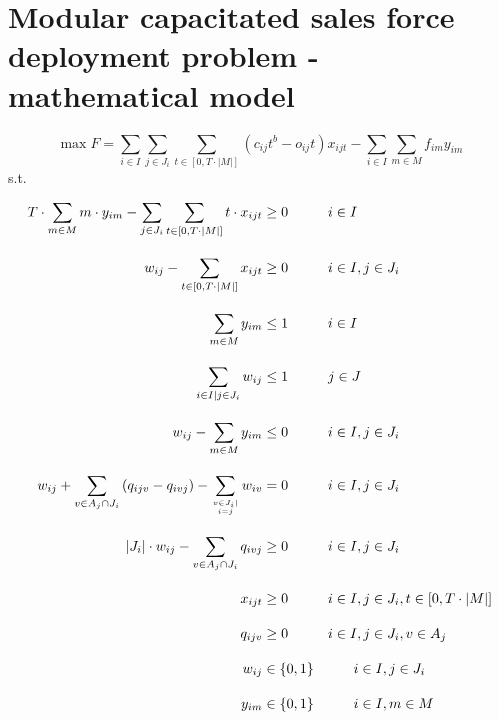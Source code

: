 \documentclass{article}
\begin{document}
\section{Modular capacitated sales force deployment problem - mathematical model}
 \vspace{4em}
\begin{equation}
     \max F = \sum_{i \in I} \sum_{j \in J_i} \sum_{t \in [0,T \cdot |M|]} (c_{ij}t^b - o_{ij}t)  x_{ijt} - \sum_{i \in I} \sum_{m \in M} f_{im} y_{im}
\end{equation}
s.t.

\begin{align}
     T \cdot \sum_{m \in M}m \cdot y_{im} - \sum_{ j \in J_i} \sum_{t\in [0,T \cdot |M|]} t \cdot x_{ijt}  &\ge 0   \hspace*{1cm} i \in I \\[1em]
     w_{ij} - \sum_{t \in \left[0,T \cdot |M| \right]}x_{ijt} &\ge 0  \hspace*{1cm} i \in I, j \in J_i \\[1em]
     \sum_{m \in M} y_{im} &\le 1 \hspace*{1cm} i \in I \\[1em]
     \sum_{i \in I\mid j \in J_i} w_{ij}  & \le 1 \hspace*{1cm} j \in J \\[1em]
     w_{ij} - \sum_{m \in M} y_{im} &\le 0     \hspace*{1cm} i \in I,  j \in J_i \\[1em]
     w_{ij} + \sum_{v \in A_j \cap J_i} \left(q_{ijv} - q_{ivj} \right) - \sum_{v \in J_i \mid \atop i=j} w_{iv} &= 0  \hspace*{1cm} i \in I,  j \in J_i \\[1em]
     \left|J_i\right|\cdot w_{ij} - \sum_{v \in A_j \cap J_i} q_{ivj} &\geq 0  \hspace*{1cm} i \in I, j \in J_i \\[1em]
     x_{ijt} &\geq 0 \hspace*{1cm} i \in I, j \in J_i, t \in \left[0,T\cdot \left|M\right|\right] \\[1em]
     q_{ijv} &\geq 0 \hspace*{1cm} i \in I, j \in J_i, v \in A_j \\[1em]
     w_{ij} &\in \{0,1\} \hspace*{1cm} i \in I, j \in J_i \\[1em]
     y_{im} &\in \{0,1\} \hspace*{1cm} i \in I, m \in M
\end{align}
\end{document}
